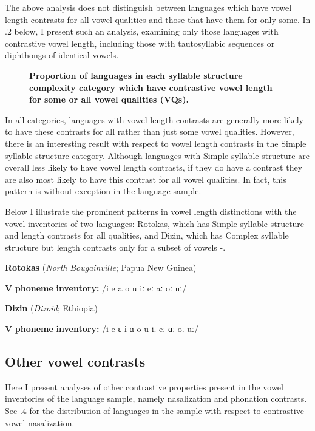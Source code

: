   The above analysis does not distinguish between languages which have vowel length contrasts for all vowel qualities and those that have them for only some. In .2 below, I present such an analysis, examining only those languages with contrastive vowel length, including those with tautosyllabic sequences or diphthongs of identical vowels.

\begin{figure}

\textbf{ Proportion of languages in each syllable structure complexity category which have contrastive vowel length for some or all vowel qualities (VQs).}
\end{figure}

  In all categories, languages with vowel length contrasts are generally more likely to have these contrasts for all rather than just some vowel qualities. However, there is an interesting result with respect to vowel length contrasts in the Simple syllable structure category. Although languages with Simple syllable structure are overall less likely to have vowel length contrasts, if they do have a contrast they are also most likely to have this contrast for all vowel qualities. In fact, this pattern is without exception in the language sample.

  Below I illustrate the prominent patterns in vowel length distinctions with the vowel inventories of two languages: Rotokas, which has Simple syllable structure and length contrasts for all qualities, and Dizin, which has Complex syllable structure but length contrasts only for a subset of vowels -.

\ea\label{ex:(4.13)}
  \textbf{Rotokas} (\textit{North} \textit{Bougainville}; Papua New Guinea)

\textbf{V} \textbf{phoneme} \textbf{inventory:} /i e a o u iː eː aː oː uː/
\z

\ea\label{ex:(4.14)}
  \textbf{Dizin} (\textit{Dizoid}; Ethiopia)

\textbf{V} \textbf{phoneme} \textbf{inventory:} /i e ɛ ɨ ɑ o u iː eː ɑː oː uː/
\z

\subsection{Other vowel contrasts}\label{sec:4.3.3}

  Here I present analyses of other contrastive properties present in the vowel inventories of the language sample, namely nasalization and phonation contrasts. See .4 for the distribution of languages in the sample with respect to contrastive vowel nasalization.

